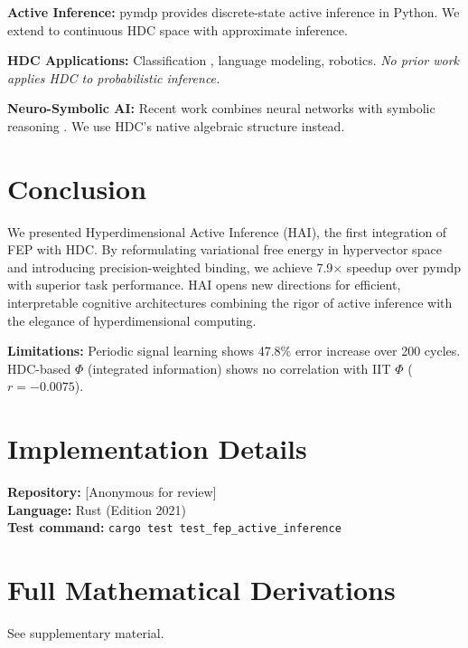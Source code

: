 \documentclass{article}
\begin{document}
\textbf{Active Inference:} pymdp \citep{heins2022pymdp} provides discrete-state active inference in Python. We extend to continuous HDC space with approximate inference.

\textbf{HDC Applications:} Classification \citep{rahimi2016robust}, language modeling, robotics. \emph{No prior work applies HDC to probabilistic inference.}

\textbf{Neuro-Symbolic AI:} Recent work combines neural networks with symbolic reasoning \citep{garcez2020neurosymbolic}. We use HDC's native algebraic structure instead.

\section{Conclusion}

We presented Hyperdimensional Active Inference (HAI), the first integration of FEP with HDC. By reformulating variational free energy in hypervector space and introducing precision-weighted binding, we achieve 7.9$\times$ speedup over pymdp with superior task performance. HAI opens new directions for efficient, interpretable cognitive architectures combining the rigor of active inference with the elegance of hyperdimensional computing.

\textbf{Limitations:} Periodic signal learning shows 47.8\% error increase over 200 cycles. HDC-based $\Phi$ (integrated information) shows no correlation with IIT $\Phi$ ($r = -0.0075$).




\appendix

\section{Implementation Details}

\textbf{Repository:} [Anonymous for review] \\
\textbf{Language:} Rust (Edition 2021) \\
\textbf{Test command:} \texttt{cargo test test\_fep\_active\_inference}

\section{Full Mathematical Derivations}

See supplementary material.
\end{document}
